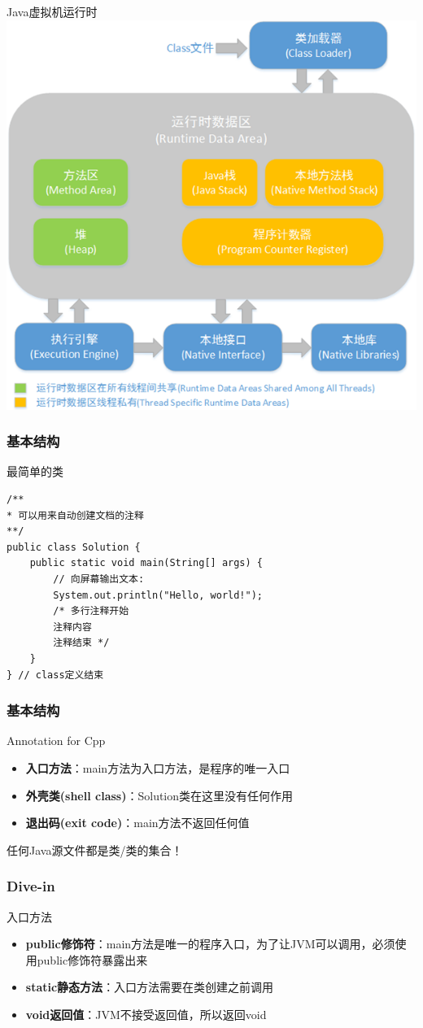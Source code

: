 \documentclass[UTF8, 16pt]{beamer}
\begin{document}
\begin{frame}
    \centering
    \textcolor{sufered}{Java虚拟机运行时}
    \includegraphics[width=0.75\linewidth]{ch1/jvm.jpg}
\end{frame}

\begin{frame}[fragile]
    \frametitle{基本结构}
    \textcolor{sufered}{最简单的类}
    \begin{lstlisting}
/**
* 可以用来自动创建文档的注释
**/
public class Solution {
    public static void main(String[] args) {
        // 向屏幕输出文本:
        System.out.println("Hello, world!");
        /* 多行注释开始
        注释内容
        注释结束 */
    }
} // class定义结束
    \end{lstlisting}
\end{frame}

\begin{frame}
    \frametitle{基本结构}
    \textcolor{sufered}{Annotation for Cpp}

    \begin{itemize}
        \item \textbf{入口方法}：main方法为入口方法，是程序的唯一入口
        \item \textbf{外壳类(shell class)}：Solution类在这里没有任何作用
        \item \textbf{退出码(exit code)}：main方法不返回任何值
    \end{itemize}

    \textcolor{sufered}{任何Java源文件都是类/类的集合！}
\end{frame}

\begin{frame}
    \frametitle{Dive-in}
    \textcolor{sufered}{入口方法}

    \begin{itemize}
        \item \textbf{public修饰符}：main方法是唯一的程序入口，为了让JVM可以调用，必须使用public修饰符暴露出来
        \item \textbf{static静态方法}：入口方法需要在类创建之前调用
        \item \textbf{void返回值}：JVM不接受返回值，所以返回void
    \end{itemize}
\end{frame}
\end{document}
